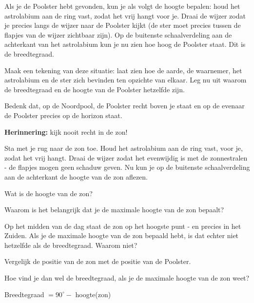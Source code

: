 Als je de Poolster hebt gevonden, kun je als volgt de hoogte bepalen: houd het astrolabium aan de ring vast, zodat het vrij hangt voor je. Draai de wijzer zodat je precies langs de wijzer naar de Poolster kijkt (de ster moet precies tussen de flapjes van de wijzer zichtbaar zijn). Op de buitenste schaalverdeling aan de achterkant van het astrolabium kun je nu zien hoe hoog de Poolster staat. Dit is de breedtegraad.

\begin{opgave}
Maak een tekening van deze situatie: laat zien hoe de aarde, de waarnemer, het astrolabium en de ster zich bevinden ten opzichte van elkaar. Leg nu uit waarom de breedtegraad en de hoogte van de Poolster hetzelfde zijn.
\begin{hint}
 Bedenk dat, op de Noordpool, de Poolster recht boven je staat en op de evenaar de Poolster precies op de horizon staat.
\end{hint}
\end{opgave}

\textbf{Herinnering: } kijk nooit recht in de zon!
\begin{opgave}[\schaar]
 \label{astrolabium:breedtegraad}
 Sta met je rug naar de zon toe. Houd het astrolabium aan de ring vast, voor je, zodat het vrij hangt. Draai de wijzer zodat het evenwijdig is met de zonnestralen - de flapjes mogen geen schaduw geven. Nu kun je op de buitenste schaalverdeling aan de achterkant de hoogte van de zon aflezen. 
 \begin{subopgave}
  Wat is de hoogte van de zon?
 \end{subopgave}
\end{opgave}

\begin{opgave}
 Waarom is het belangrijk dat je de maximale hoogte van de zon bepaalt?
\end{opgave}

\begin{opgave}
 Op het midden van de dag staat de zon op het hoogste punt - en precies in het Zuiden. Als je de maximale hoogte van de zon bepaald hebt, is dat echter niet hetzelfde als de breedtegraad. Waarom niet?
 \begin{hint}
  Vergelijk de positie van de zon met de positie van de Poolster.
 \end{hint}
\end{opgave}

\begin{opgave}
 Hoe vind je dan wel de breedtegraad, als je de maximale hoogte van de zon weet?
 \begin{antwoord}
  Breedtegraad $= 90^{\circ} -$ hoogte(zon)
 \end{antwoord}
\end{opgave}

